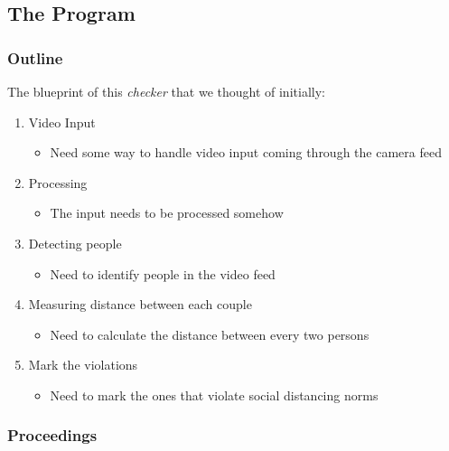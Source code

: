 \documentclass[a4paper]{article}
\begin{document}
\subsection{The Program}

\subsubsection{Outline}
The blueprint of this \textit{checker} that we thought of initially:

\begin{enumerate}
    \item Video Input
          \begin{itemize}[label=$-$]
              \item Need some way to handle video input coming through the camera feed
          \end{itemize}

    \item Processing
          \begin{itemize}[label=$-$]
              \item The input needs to be processed somehow
          \end{itemize}

    \item Detecting people
          \begin{itemize}[label=$-$]
              \item Need to identify people in the video feed
          \end{itemize}

    \item Measuring distance between each couple
          \begin{itemize}[label=$-$]
              \item Need to calculate the distance between every two persons
          \end{itemize}

    \item Mark the violations
          \begin{itemize}[label=$-$]
              \item Need to mark the ones that violate social distancing norms
          \end{itemize}
\end{enumerate}

\subsubsection{Proceedings}
\end{document}
